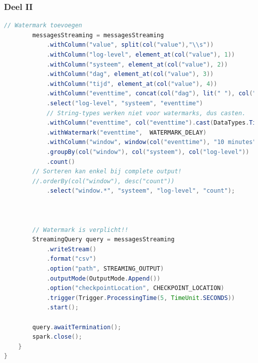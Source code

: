 \documentclass[a4paper,10pt,twoside]{report}
\begin{document}
\newpage

\subsubsection{Deel II}

\begin{lstlisting}[language=Java]
		// Watermark toevoegen
		messagesStreaming = messagesStreaming
			.withColumn("value", split(col("value"),"\\s"))
			.withColumn("log-level", element_at(col("value"), 1))
			.withColumn("systeem", element_at(col("value"), 2))
			.withColumn("dag", element_at(col("value"), 3))
			.withColumn("tijd", element_at(col("value"), 4))
			.withColumn("eventtime", concat(col("dag"), lit(" "), col("tijd")))
			.select("log-level", "systeem", "eventtime")
			// String-types werken niet voor watermarks, dus casten.
			.withColumn("eventtime", col("eventtime").cast(DataTypes.TimestampType))
			.withWatermark("eventtime",  WATERMARK_DELAY)
			.withColumn("window", window(col("eventtime"), "10 minutes", "5 minutes"))
			.groupBy(col("window"), col("systeem"), col("log-level"))
			.count()
		// Sorteren kan enkel bij complete output!
		//.orderBy(col("window"), desc("count"))
			.select("window.*", "systeem", "log-level", "count");
		
		
		
		// Watermark is verplicht!!
		StreamingQuery query = messagesStreaming
			.writeStream()
			.format("csv")
			.option("path", STREAMING_OUTPUT)
			.outputMode(OutputMode.Append())
			.option("checkpointLocation", CHECKPOINT_LOCATION)
			.trigger(Trigger.ProcessingTime(5, TimeUnit.SECONDS))
			.start();
		
		query.awaitTermination();
		spark.close();	
	}	
}
\end{lstlisting}
\end{document}
